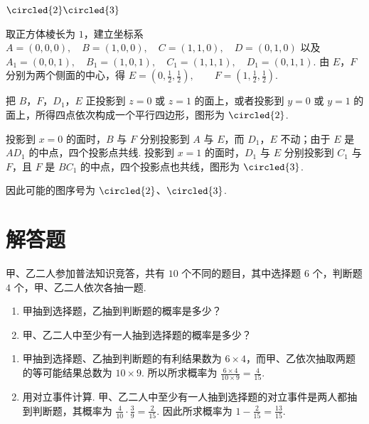 \begin{answer}
\(\circled{2}\circled{3}\)
\end{answer}

\begin{solution}
取正方体棱长为 \(1\)，建立坐标系
\(
A=(0,0,0),\quad B=(1,0,0),\quad C=(1,1,0),\quad D=(0,1,0)
\)
以及
\(
A_{1}=(0,0,1),\quad B_{1}=(1,0,1),\quad C_{1}=(1,1,1),\quad D_{1}=(0,1,1)
\).
由 \(E\)，\(F\) 分别为两个侧面的中心，得
\(
E=\left(0,\frac12,\frac12\right),\qquad F=\left(1,\frac12,\frac12\right)
\).

把 \(B\)，\(F\)，\(D_{1}\)，\(E\) 正投影到 \(z=0\) 或 \(z=1\) 的面上，或者投影到 \(y=0\) 或 \(y=1\) 的面上，所得四点依次构成一个平行四边形，图形为 \(\circled{2}\).

投影到 \(x=0\) 的面时，\(B\) 与 \(F\) 分别投影到 \(A\) 与 \(E\)，而 \(D_{1}\)，\(E\) 不动；由于 \(E\) 是 \(AD_{1}\) 的中点，四个投影点共线. 投影到 \(x=1\) 的面时，\(D_{1}\) 与 \(E\) 分别投影到 \(C_{1}\) 与 \(F\)，且 \(F\) 是 \(BC_{1}\) 的中点，四个投影点也共线，图形为 \(\circled{3}\).

因此可能的图序号为 \(\circled{2}\)、\(\circled{3}\).
\end{solution}

\section{解答题}
\begin{problem}
甲、乙二人参加普法知识竞答，共有 \(10\) 个不同的题目，其中选择题 \(6\) 个，判断题 \(4\) 个，甲、乙二人依次各抽一题.

\begin{enumerate}
\item 甲抽到选择题，乙抽到判断题的概率是多少？
\item 甲、乙二人中至少有一人抽到选择题的概率是多少？
\end{enumerate}
\end{problem}

\begin{solution}
\begin{enumerate}
\item 甲抽到选择题、乙抽到判断题的有利结果数为 \(6\times4\)，而甲、乙依次抽取两题的等可能结果总数为 \(10\times9\). 所以所求概率为
\(
\frac{6\times4}{10\times9}=\frac{4}{15}
\).

\item 用对立事件计算. 甲、乙二人中至少有一人抽到选择题的对立事件是两人都抽到判断题，其概率为
\(
\frac{4}{10}\cdot\frac{3}{9}=\frac{2}{15}
\).
因此所求概率为
\(
1-\frac{2}{15}=\frac{13}{15}
\).
\end{enumerate}
\end{solution}

